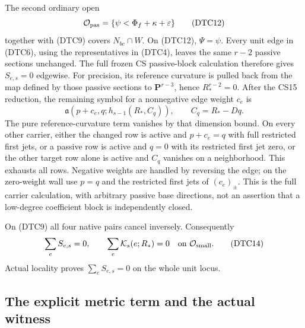 The second ordinary open
\[
 \mathcal O_{\rm pas}=\{\psi<\Phi_f+\kappa+\varepsilon\}
 \tag{DTC12}
\]
together with (DTC9) covers $N_{bc}\cap W$.  On (DTC12), $\Psi=\psi$.
Every unit edge in (DTC6), using the representatives in (DTC4),
leaves the same $r-2$ passive sections unchanged.  The full frozen
CS passive-block calculation therefore gives $S_{e,s}=0$ edgewise.
For precision, its reference curvature is pulled back from the map
defined by those passive sections to $\mathbf P^{r-3}$, hence
$R_*^{r-2}=0$.  After the CS15 reduction, the remaining symbol for a
nonnegative edge weight $c_e$ is
\[
 \mathfrak a(p+c_e,q;h_{s-1}(R_*,C_q)),\qquad C_q=R_*-Dq.
 \tag{DTC13}
\]
The pure reference-curvature term vanishes by that dimension bound.
On every other carrier, either the changed row is active and
$p+c_e=q$ with full restricted first jets, or a passive row is
active and $q=0$ with its restricted first jet zero, or the other
target row alone is active and $C_q$ vanishes on a neighborhood.
This exhausts all rows.  Negative weights are handled by reversing
the edge; on the zero-weight wall use $p=q$ and the restricted
first jets of $(c_e)_\pm$.  This is the full carrier calculation,
with arbitrary passive base directions, not an assertion that a
low-degree coefficient block is independently closed.

On (DTC9) all four native pairs cancel inversely.  Consequently
\[
 \sum_e S_{e,s}=0,\qquad \sum_e\mathcal K_s(e;R_*)=0
                   \quad\hbox{on }\mathcal O_{\rm small}.
 \tag{DTC14}
\]
Actual locality proves $\sum_eS_{e,s}=0$ on the whole unit locus.

\subsection{The explicit metric term and the actual witness}

